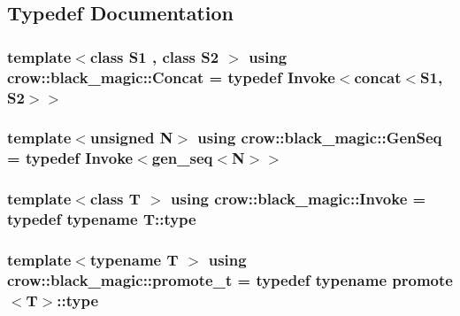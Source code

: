 \subsection{Typedef Documentation}
\hypertarget{namespacecrow_1_1black__magic_aa5da930ee46c60876b74714b9cbd9822}{
\subsubsection[{Concat}]{\setlength{\rightskip}{0pt plus 5cm}template$<$class S1 , class S2 $>$ using {\bf crow\-::black\-\_\-magic\-::\-Concat} = typedef {\bf Invoke}$<${\bf concat}$<$S1, S2$>$$>$}}\label{namespacecrow_1_1black__magic_aa5da930ee46c60876b74714b9cbd9822}
\hypertarget{namespacecrow_1_1black__magic_a697b4738762ac4a1e0d56df7dc0aa5a9}{
\subsubsection[{Gen\-Seq}]{\setlength{\rightskip}{0pt plus 5cm}template$<$unsigned N$>$ using {\bf crow\-::black\-\_\-magic\-::\-Gen\-Seq} = typedef {\bf Invoke}$<${\bf gen\-\_\-seq}$<$N$>$$>$}}\label{namespacecrow_1_1black__magic_a697b4738762ac4a1e0d56df7dc0aa5a9}
\hypertarget{namespacecrow_1_1black__magic_a6b8ed264432b676b8f13faf399c7343f}{
\subsubsection[{Invoke}]{\setlength{\rightskip}{0pt plus 5cm}template$<$class T $>$ using {\bf crow\-::black\-\_\-magic\-::\-Invoke} = typedef typename T\-::type}}\label{namespacecrow_1_1black__magic_a6b8ed264432b676b8f13faf399c7343f}
\hypertarget{namespacecrow_1_1black__magic_a4964540ce915507f5167e1a96f801c71}{
\subsubsection[{promote\-\_\-t}]{\setlength{\rightskip}{0pt plus 5cm}template$<$typename T $>$ using {\bf crow\-::black\-\_\-magic\-::promote\-\_\-t} = typedef typename {\bf promote}$<$T$>$\-::type}}\label{namespacecrow_1_1black__magic_a4964540ce915507f5167e1a96f801c71}


